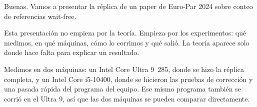 Buenas. Vamos a presentar la réplica de un paper de Euro-Par 2024 sobre conteo de referencias wait-free.

Esta presentación no empieza por la teoría. Empieza por los experimentos: qué medimos, en qué máquinas, cómo lo corrimos y qué salió. La teoría aparece solo donde hace falta para explicar un resultado.

Medimos en dos máquinas: un Intel Core Ultra 9~285, donde se hizo la réplica completa, y un Intel Core i5-10400, donde se hicieron las pruebas de corrección y una pasada rápida del programa del equipo. Ese mismo programa también se corrió en el Ultra 9, así que las dos máquinas se pueden comparar directamente.
